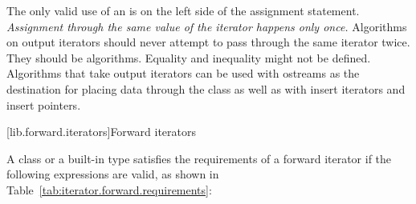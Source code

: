 \pnum
\enternote
The only valid use of an
is on the left side of the assignment statement.
\textit{Assignment through the same value of the iterator happens only once.}
Algorithms on output iterators should never attempt to pass through the same iterator twice.
They should be
algorithms.
Equality and inequality might not be defined.
Algorithms that take output iterators can be used with ostreams as the destination
for placing data through the
class as well as with insert iterators and insert pointers.
\exitnoteb

[lib.forward.iterators]{Forward iterators}

\pnum
A class or a built-in type
satisfies the requirements of a forward iterator if the following expressions
are valid, as shown in Table~\ref{tab:iterator.forward.requirements}:

